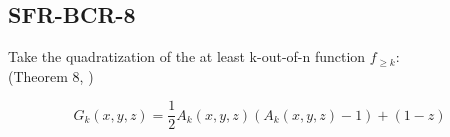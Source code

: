 \documentclass[a4paper,english,notitlepage,longbibliography,showpacs,preprintnumbers,amsmath,amssymb,aps,prx,nofootinbib,12pt,superscriptaddress]{revtex4-1}
\begin{document}
\begin{comment}
  The coefficients are
  \begin{subequations}
  \begin{align}
  \alpha &= \frac{1}{2}(k^2+3k+2), \\
  \alpha^{b} &= -\frac{1}{2}(2k+3), \\
  \alpha^{b_{a,1}} &= (k+2)2^{j-1}, \\
  \alpha^{b_{a,2}} &= \frac{1}{2}(1+2^l)(2^l-2k-2), \\
  \alpha^{bb} &= \frac{1}{2}, \\
  \alpha^{bb_{a,1}} &= -2^{j}, \\
  \alpha^{bb_{a,2}} &= (1+2^l), \\
  \alpha^{b_ab_{a,1}} &= 2^{j+j'-1}, \\
  \alpha^{b_ab_{a,2}} &= -(1+2^l)2^{j}.
  \end{align}
  \end{subequations}

  Dictionary: \\
  $l\mapsto m$,\\
  $x_i\mapsto b_i$, \\
  $y_j\mapsto b_{a_j}$,\\
  $z\mapsto b_{a_m}$,\\
  $k\mapsto c$.
\end{comment}


\subsection{SFR-BCR-8}

Take the quadratization of the at least k-out-of-n function $f_{\geq k}$:
\\(Theorem 8, \cite{Boros2018boundsPaper})

\begin{equation}
  G_k(x,y,z) = \frac{1}{2}A_k(x,y,z)(A_k(x,y,z)-1) + (1-z)
\end{equation}
\end{document}
